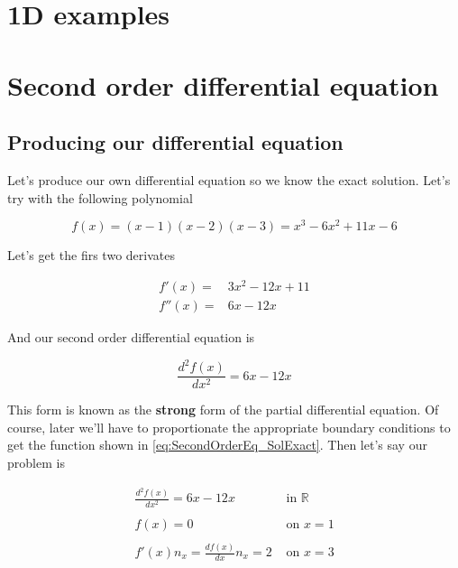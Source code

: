 \documentclass[letterpaper,10pt]{article}
\begin{document}
\section{1D examples}

\section{Second order differential equation}

\subsection{Producing our differential equation}

Let's produce our own differential equation so we know the exact solution. Let's try with the following polynomial

\begin{equation}
f(x) = (x-1)(x-2)(x-3) = x^3 - 6x^2 + 11x - 6
\label{eq:SecondOrderEq_SolExact}
\end{equation}

Let's get the firs two derivates

\[
\begin{array}{rl}
f'(x) = & 3x^2 - 12x + 11 \\
f''(x) = & 6x - 12x
\end{array}
\]

And our second order differential equation is

\begin{equation}
\frac{d^2 f(x)}{dx^2} = 6x - 12x
\label{eq:SecondOrderEq}
\end{equation}

This form is known as the \textbf{strong} form of the partial differential equation. Of course, later we'll have to proportionate the appropriate boundary conditions to get the function shown in \ref{eq:SecondOrderEq_SolExact}. Then let's say our problem is





\begin{equation}
\begin{array}{rl}
\displaystyle
\frac{d^2 f(x)}{dx^2} = 6x - 12x & \textrm{ in } \mathbb{R} \\ \\
\displaystyle
f(x) = 0 & \textrm{ on } x = 1 \\ \\
\displaystyle
f'(x) n_x = \frac{d f(x)}{d x} n_x = 2 & \textrm{ on } x = 3 
\end{array}
\label{eq:Problem_StrongForm}
\end{equation}
\end{document}
